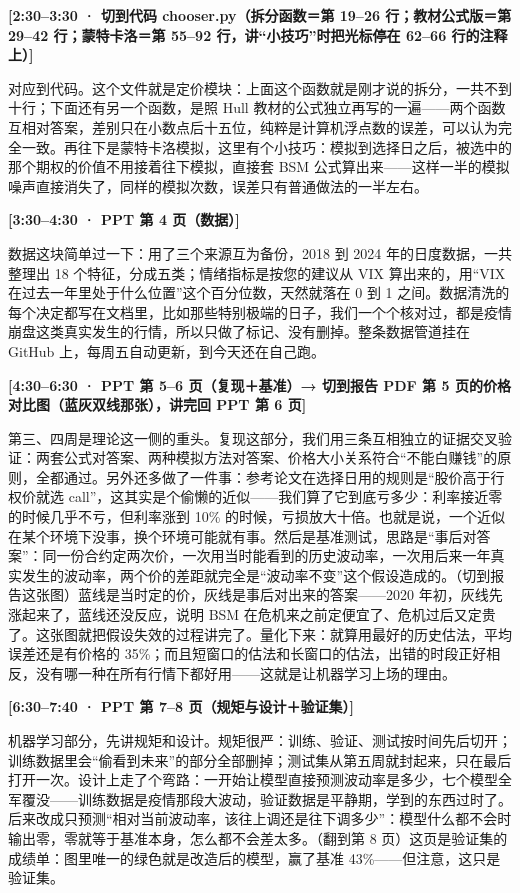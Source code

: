 \documentclass[11pt]{ctexart}
\newcommand{\cue}[1]{\noindent\colorbox{gray!15}{\parbox{\dimexpr\linewidth-2\fboxsep}{\textbf{#1}}}\par\smallskip}
\begin{document}
\cue{[2:30--3:30 · 切到代码 chooser.py（拆分函数＝第 19--26 行；教材公式版＝第 29--42 行；蒙特卡洛＝第 55--92 行，讲“小技巧”时把光标停在 62--66 行的注释上）]}
对应到代码。这个文件就是定价模块：上面这个函数就是刚才说的拆分，一共不到十行；下面还有另一个函数，是照 Hull 教材的公式独立再写的一遍——两个函数互相对答案，差别只在小数点后十五位，纯粹是计算机浮点数的误差，可以认为完全一致。再往下是蒙特卡洛模拟，这里有个小技巧：模拟到选择日之后，被选中的那个期权的价值不用接着往下模拟，直接套 BSM 公式算出来——这样一半的模拟噪声直接消失了，同样的模拟次数，误差只有普通做法的一半左右。

\cue{[3:30--4:30 · PPT 第 4 页（数据）]}
数据这块简单过一下：用了三个来源互为备份，2018 到 2024 年的日度数据，一共整理出 18 个特征，分成五类；情绪指标是按您的建议从 VIX 算出来的，用“VIX 在过去一年里处于什么位置”这个百分位数，天然就落在 0 到 1 之间。数据清洗的每个决定都写在文档里，比如那些特别极端的日子，我们一个个核对过，都是疫情崩盘这类真实发生的行情，所以只做了标记、没有删掉。整条数据管道挂在 GitHub 上，每周五自动更新，到今天还在自己跑。

\cue{[4:30--6:30 · PPT 第 5--6 页（复现＋基准）→ 切到报告 PDF 第 5 页的价格对比图（蓝灰双线那张），讲完回 PPT 第 6 页]}
第三、四周是理论这一侧的重头。复现这部分，我们用三条互相独立的证据交叉验证：两套公式对答案、两种模拟方法对答案、价格大小关系符合“不能白赚钱”的原则，全都通过。另外还多做了一件事：参考论文在选择日用的规则是“股价高于行权价就选 call”，这其实是个偷懒的近似——我们算了它到底亏多少：利率接近零的时候几乎不亏，但利率涨到 10\% 的时候，亏损放大十倍。也就是说，一个近似在某个环境下没事，换个环境可能就有事。然后是基准测试，思路是“事后对答案”：同一份合约定两次价，一次用当时能看到的历史波动率，一次用后来一年真实发生的波动率，两个价的差距就完全是“波动率不变”这个假设造成的。（切到报告这张图）蓝线是当时定的价，灰线是事后对出来的答案——2020 年初，灰线先涨起来了，蓝线还没反应，说明 BSM 在危机来之前定便宜了、危机过后又定贵了。这张图就把假设失效的过程讲完了。量化下来：就算用最好的历史估法，平均误差还是有价格的 35\%；而且短窗口的估法和长窗口的估法，出错的时段正好相反，没有哪一种在所有行情下都好用——这就是让机器学习上场的理由。

\cue{[6:30--7:40 · PPT 第 7--8 页（规矩与设计＋验证集）]}
机器学习部分，先讲规矩和设计。规矩很严：训练、验证、测试按时间先后切开；训练数据里会“偷看到未来”的部分全部删掉；测试集从第五周就封起来，只在最后打开一次。设计上走了个弯路：一开始让模型直接预测波动率是多少，七个模型全军覆没——训练数据是疫情那段大波动，验证数据是平静期，学到的东西过时了。后来改成只预测“相对当前波动率，该往上调还是往下调多少”：模型什么都不会时输出零，零就等于基准本身，怎么都不会差太多。（翻到第 8 页）这页是验证集的成绩单：图里唯一的绿色就是改造后的模型，赢了基准 43\%——但注意，这只是验证集。
\end{document}
